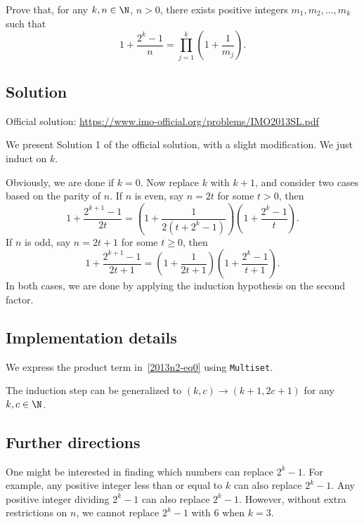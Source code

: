 Prove that, for any $k, n \in \N$, $n > 0$, there exists positive integers $m_1, m_2, \ldots, m_k$ such that
\[ 1 + \frac{2^k - 1}{n} = \prod_{j = 1}^k \left(1 + \frac{1}{m_j}\right). \tag{*}\label{2013n2-eq0} \]



\subsection*{Solution}

Official solution: \url{https://www.imo-official.org/problems/IMO2013SL.pdf}

We present Solution 1 of the official solution, with a slight modification.
We just induct on $k$.

Obviously, we are done if $k = 0$.
Now replace $k$ with $k + 1$, and consider two cases based on the parity of $n$.
If $n$ is even, say $n = 2t$ for some $t > 0$, then
\[ 1 + \frac{2^{k + 1} - 1}{2t} = \left(1 + \frac{1}{2(t + 2^k - 1)}\right) \left(1 + \frac{2^k - 1}{t}\right). \]
If $n$ is odd, say $n = 2t + 1$ for some $t \geq 0$, then
\[ 1 + \frac{2^{k + 1} - 1}{2t + 1} = \left(1 + \frac{1}{2t + 1}\right) \left(1 + \frac{2^k - 1}{t + 1}\right). \]
In both cases, we are done by applying the induction hypothesis on the second factor.



\subsection*{Implementation details}

We express the product term in~\eqref{2013n2-eq0} using \texttt{Multiset}.

The induction step can be generalized to $(k, c) \to (k + 1, 2c + 1)$ for any $k, c \in \N$.



\subsection*{Further directions}

One might be interested in finding which numbers can replace $2^k - 1$.
For example, any positive integer less than or equal to $k$ can also replace $2^k - 1$.
Any positive integer dividing $2^k - 1$ can also replace $2^k - 1$.
However, without extra restrictions on $n$, we cannot replace $2^k - 1$ with $6$ when $k = 3$.
